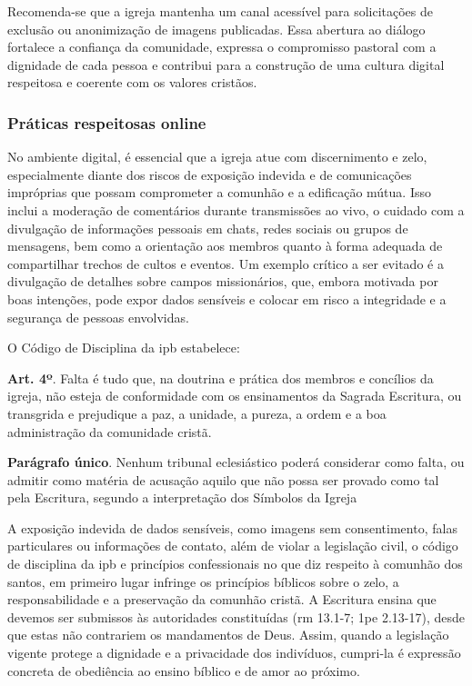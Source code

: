 Recomenda-se que a igreja mantenha um canal acessível para solicitações de exclusão ou anonimização de imagens publicadas. Essa abertura ao diálogo fortalece a confiança da comunidade, expressa o compromisso pastoral com a dignidade de cada pessoa e contribui para a construção de uma cultura digital respeitosa e coerente com os valores cristãos.

\subsubsection{Práticas respeitosas online}

No ambiente digital, é essencial que a igreja atue com discernimento e zelo, especialmente diante dos riscos de exposição indevida e de comunicações impróprias que possam comprometer a comunhão e a edificação mútua. Isso inclui a moderação de comentários durante transmissões ao vivo, o cuidado com a divulgação de informações pessoais em chats, redes sociais ou grupos de mensagens, bem como a orientação aos membros quanto à forma adequada de compartilhar trechos de cultos e eventos. Um exemplo crítico a ser evitado é a divulgação de detalhes sobre campos missionários, que, embora motivada por boas intenções, pode expor dados sensíveis e colocar em risco a integridade e a segurança de pessoas envolvidas.

O Código de Disciplina da \gls{ipb} estabelece:

\begin{citacao}
    \textbf{Art. 4º}. Falta é tudo que, na doutrina e prática dos membros e concílios da igreja, não esteja de conformidade com os ensinamentos da Sagrada Escritura, ou transgrida e prejudique a paz, a unidade, a pureza, a ordem e a boa administração da comunidade cristã.

    \textbf{Parágrafo único}. Nenhum tribunal eclesiástico poderá considerar como falta, ou admitir como matéria de acusação aquilo que não possa ser provado como tal pela Escritura, segundo a interpretação dos Símbolos da Igreja \cite[art.~4]{ipb_codigodisciplina}
\end{citacao} 

A exposição indevida de dados sensíveis, como imagens sem consentimento, falas particulares ou informações de contato, além de violar a legislação civil, o código de disciplina da \gls{ipb} e princípios confessionais no que diz respeito à comunhão dos santos, em primeiro lugar infringe os princípios bíblicos sobre o zelo, a responsabilidade e a preservação da comunhão cristã. A Escritura ensina que devemos ser submissos às autoridades constituídas (\gls{rm} 13.1-7; \gls{1pe} 2.13-17), desde que estas não contrariem os mandamentos de Deus. Assim, quando a legislação vigente protege a dignidade e a privacidade dos indivíduos, cumpri-la é expressão concreta de obediência ao ensino bíblico e de amor ao próximo.

